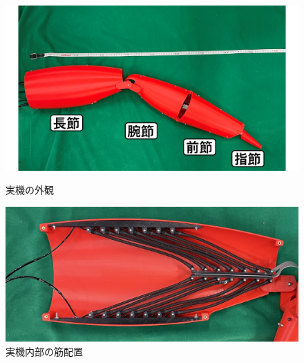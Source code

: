 \documentclass{jarticle}
\begin{document}
\begin{figure}[!t]
  \begin{minipage}[b]{0.47\columnwidth}
    \centering
    \includegraphics[scale=0.1]{image/jikki.png}
    \vspace{-2mm}
    \caption{実機の外観}
    \label{fig:jikki}
  \end{minipage}
  \hspace{0.04\columnwidth}
  \begin{minipage}[b]{0.47\columnwidth}
    \centering
    \includegraphics[scale=0.03]{image/crabmuscle.jpg}
    \vspace{1mm}
    \caption{実機内部の筋配置}
    \label{fig:muscle}
  \end{minipage}
\end{figure}
\end{document}
